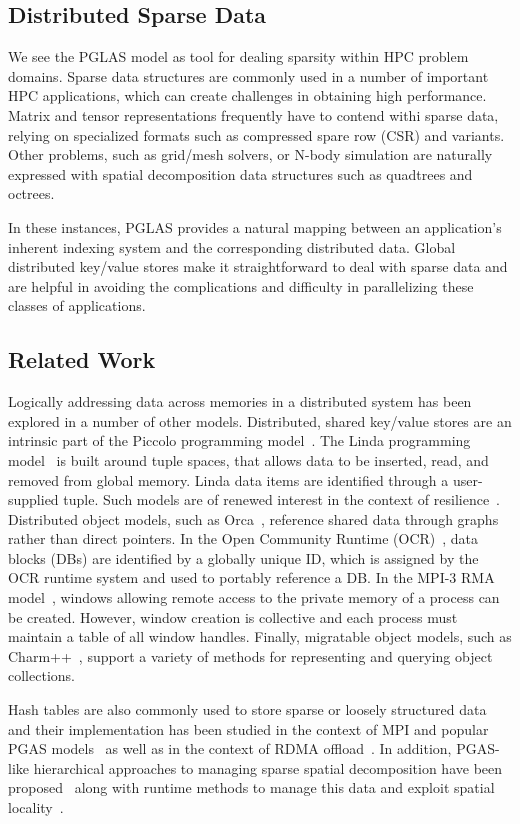 \subsection{Distributed Sparse Data}

We see the PGLAS model as tool for dealing sparsity within HPC problem domains.  
Sparse data structures are commonly used in a number of important HPC 
applications, which can create challenges in obtaining high performance. Matrix 
and tensor representations frequently have to contend withi sparse data, 
relying on specialized formats such as compressed spare row (CSR) and variants.  
Other problems, such as grid/mesh solvers, or N-body simulation are naturally 
expressed with spatial decomposition data structures such as quadtrees and 
octrees. 

In these instances, PGLAS provides a natural mapping between an application's 
inherent indexing system and the corresponding distributed data. Global 
distributed key/value stores make it straightforward to deal with sparse data 
and are helpful in avoiding the complications and difficulty in parallelizing 
these classes of applications.

\subsection{Related Work} 

Logically addressing data across memories in a distributed
system has been explored in a number of other models.  Distributed,
shared key/value stores are an intrinsic part of the Piccolo
programming model~\cite{power:10}.  The Linda programming
model~\cite{ahuja:86} is built around tuple spaces, that allows data
to be inserted, read, and removed from global memory. Linda data items
are identified through a user-supplied tuple.  Such models are of
renewed interest in the context of resilience~\cite{wilke:14}.
Distributed object models, such as Orca~\cite{bal:92}, reference
shared data through graphs rather than direct pointers.  In the Open
Community Runtime (OCR)~\cite{OCR}, data blocks (DBs) are identified
by a globally unique ID, which is assigned by the OCR runtime system
and used to portably reference a DB.  In the MPI-3 RMA 
model~\cite{mpi-forum:15}, windows allowing remote
access to the private memory of a process can be created.  However,
window creation is collective and each process must maintain a table of
all window handles.  Finally, migratable object
models, such as Charm++~\cite{kale:93}, support a variety of methods
for representing and querying object collections.

Hash tables are also commonly used to store sparse or loosely structured
data~\cite{memcached04,chord01,docan:12}
and their implementation has been studied in the context of MPI and popular PGAS
models~\cite{zht13,fompi13,cmpi10,maynard:12,memcached12,mht15} as well as in
the context of RDMA offload~\cite{memcached12,mitchell:13,kalia:14}.  In
addition, PGAS-like hierarchical approaches to
managing sparse spatial decomposition have been proposed~\cite{larkins:08}
along with runtime methods to manage this data and exploit spatial
locality~\cite{larkins:12}.


